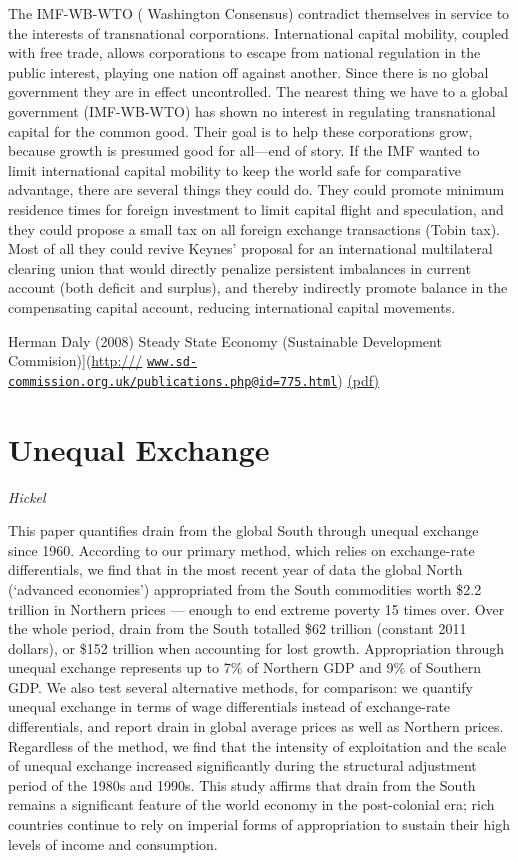 \documentclass[
]{book}
\begin{document}
The IMF-WB-WTO ( Washington Consensus) contradict themselves in service to the interests of transnational
corporations. International capital mobility, coupled with free trade, allows corporations to escape from national
regulation in the public interest, playing one nation off against another. Since there is no global government they
are in effect uncontrolled. The nearest thing we have to a global government (IMF-WB-WTO) has shown no
interest in regulating transnational capital for the common good. Their goal is to help these corporations grow,
because growth is presumed good for all---end of story.
If the IMF wanted to limit international capital mobility to keep the world safe for comparative advantage, there are
several things they could do. They could promote minimum residence times for foreign investment to limit capital
flight and speculation, and they could propose a small tax on all foreign exchange transactions (Tobin tax). Most of all
they could revive Keynes' proposal for an international multilateral clearing union that would directly penalize
persistent imbalances in current account (both deficit and surplus), and thereby indirectly promote balance in the
compensating capital account, reducing international capital movements.

Herman Daly (2008) Steady State Economy (Sustainable Development Commision){]}(\url{http:///}
\href{mailto:www.sd-commission.org.uk/publications.php@id=775.html}{\nolinkurl{www.sd-commission.org.uk/publications.php@id=775.html}})
\href{pdf/Daly_2008_Steady_State_Economy_SD_Commision.pdf}{(pdf)}

\hypertarget{unequal-exchange}{%
\section{Unequal Exchange}\label{unequal-exchange}}

\emph{Hickel}

This paper quantifies drain from the global South through unequal
exchange since 1960. According to our primary method, which relies on
exchange-rate differentials, we find that in the most recent year of data
the global North (`advanced economies') appropriated from the South
commodities worth \$2.2 trillion in Northern prices --- enough to end
extreme poverty 15 times over. Over the whole period, drain from the
South totalled \$62 trillion (constant 2011 dollars), or \$152 trillion when
accounting for lost growth. Appropriation through unequal exchange
represents up to 7\% of Northern GDP and 9\% of Southern GDP. We also
test several alternative methods, for comparison: we quantify unequal
exchange in terms of wage differentials instead of exchange-rate
differentials, and report drain in global average prices as well as
Northern prices. Regardless of the method, we find that the intensity of
exploitation and the scale of unequal exchange increased significantly
during the structural adjustment period of the 1980s and 1990s. This
study affirms that drain from the South remains a significant feature of
the world economy in the post-colonial era; rich countries continue to
rely on imperial forms of appropriation to sustain their high levels of
income and consumption.
\end{document}
